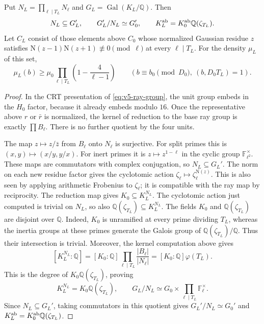 \begin{lemma}
\label{lem:v5-ray-fibres}
Put $N_L=\prod_{\ell\mid T_L}N_\ell$ and
$G_L=\operatorname{Gal}(K_L/\mathbb Q)$.
Then
\[
 N_L\subseteq G_L',\qquad
 G_L'/N_L\simeq G_0',\qquad
 K_L^{\rm ab}=K_0^{\rm ab}\mathbb Q(\zeta_{T_L}).
\]
Let $C_L$ consist of those elements above $C_0$ whose normalized Gaussian
residue $z$ satisfies $\mathrm N(z-1)\mathrm N(z+1)\not\equiv0\pmod\ell$
at every $\ell\mid T_L$. For the density $\mu_L$ of this set,
\begin{equation}\label{eq:v5-ray-density}
 \mu_L(b)\geq\mu_0
       \prod_{\ell\mid T_L}\left(1-\frac4{\ell-1}\right)
 \qquad (b\equiv b_0\pmod{D_0},\ (b,D_0T_L)=1).
\end{equation}
\end{lemma}
\begin{proof}
In the CRT presentation of \eqref{eq:v5-ray-group}, the unit group
embeds in the $H_0$ factor, because it already embeds modulo $16$.
Once the representative above $r$ or $\bar r$ is normalized, the kernel
of reduction to the base ray group is exactly $\prod B_\ell$.
There is no further quotient by the four units.

The map $z\mapsto z/\bar z$ from $B_\ell$ onto $N_\ell$ is surjective.
For split primes this is $(x,y)\mapsto(x/y,y/x)$.
For inert primes it is $z\mapsto z^{1-\ell}$ in the cyclic group
$\mathbb F_{\ell^2}^\times$.
These maps are commutators with complex conjugation, so $N_L\subseteq G_L'$.
The norm on each new residue factor gives the cyclotomic action
$\zeta_\ell\mapsto\zeta_\ell^{\mathrm N(z)}$.
This is also seen by applying arithmetic Frobenius to $\zeta_\ell$;
it is compatible with the ray map by reciprocity.
The reduction map gives $K_0\subseteq K_L^{N_L}$. The cyclotomic
action just computed is trivial on $N_L$, so also
$\mathbb Q(\zeta_{T_L})\subseteq K_L^{N_L}$.
The fields $K_0$ and $\mathbb Q(\zeta_{T_L})$ are disjoint over
$\mathbb Q$. Indeed, $K_0$ is unramified at every prime dividing
$T_L$, whereas the inertia groups at these primes generate the
Galois group of $\mathbb Q(\zeta_{T_L})/\mathbb Q$. Thus their
intersection is trivial. Moreover, the kernel computation above gives
\[
 [K_L^{N_L}:\mathbb Q]
 =[K_0:\mathbb Q]\prod_{\ell\mid T_L}\frac{|B_\ell|}{|N_\ell|}
 =[K_0:\mathbb Q]\varphi(T_L).
\]
This is the degree of $K_0\mathbb Q(\zeta_{T_L})$, proving
\[
 K_L^{N_L}=K_0\mathbb Q(\zeta_{T_L}),\qquad
 G_L/N_L\simeq G_0\times\prod_{\ell\mid T_L}\mathbb F_\ell^\times.
\]
Since $N_L\subseteq G_L'$, taking commutators in this quotient gives
$G_L'/N_L\simeq G_0'$ and
$K_L^{\rm ab}=K_0^{\rm ab}\mathbb Q(\zeta_{T_L})$.


\end{proof}
